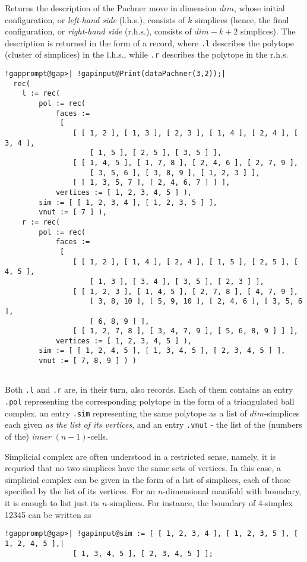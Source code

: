 \documentclass[a4paper,11pt]{report}
\begin{document}
{{{ Returns the description of the Pachner move in dimension $dim$, whose initial configuration, or \emph{left-hand side} (l.h.s.), consists of $k$ simplices (hence, the final configuration, or \emph{right-hand side} (r.h.s.), consists of $dim-k+2$ simplices). The description is returned in the form of a record, where \texttt{.l} describes the polytope (cluster of simplices) in the l.h.s., while \texttt{.r} describes the polytope in the r.h.s. 
\begin{Verbatim}[commandchars=!@|,fontsize=\small,frame=single,label=Example]
  !gapprompt@gap>| !gapinput@Print(dataPachner(3,2));|
  rec(
    l := rec(
        pol := rec(
            faces :=
             [
                [ [ 1, 2 ], [ 1, 3 ], [ 2, 3 ], [ 1, 4 ], [ 2, 4 ], [ 3, 4 ],
                    [ 1, 5 ], [ 2, 5 ], [ 3, 5 ] ],
                [ [ 1, 4, 5 ], [ 1, 7, 8 ], [ 2, 4, 6 ], [ 2, 7, 9 ],
                    [ 3, 5, 6 ], [ 3, 8, 9 ], [ 1, 2, 3 ] ],
                [ [ 1, 3, 5, 7 ], [ 2, 4, 6, 7 ] ] ],
            vertices := [ 1, 2, 3, 4, 5 ] ),
        sim := [ [ 1, 2, 3, 4 ], [ 1, 2, 3, 5 ] ],
        vnut := [ 7 ] ),
    r := rec(
        pol := rec(
            faces :=
             [
                [ [ 1, 2 ], [ 1, 4 ], [ 2, 4 ], [ 1, 5 ], [ 2, 5 ], [ 4, 5 ],
                    [ 1, 3 ], [ 3, 4 ], [ 3, 5 ], [ 2, 3 ] ],
                [ [ 1, 2, 3 ], [ 1, 4, 5 ], [ 2, 7, 8 ], [ 4, 7, 9 ],
                    [ 3, 8, 10 ], [ 5, 9, 10 ], [ 2, 4, 6 ], [ 3, 5, 6 ],
                    [ 6, 8, 9 ] ],
                [ [ 1, 2, 7, 8 ], [ 3, 4, 7, 9 ], [ 5, 6, 8, 9 ] ] ],
            vertices := [ 1, 2, 3, 4, 5 ] ),
        sim := [ [ 1, 2, 4, 5 ], [ 1, 3, 4, 5 ], [ 2, 3, 4, 5 ] ],
        vnut := [ 7, 8, 9 ] ) )
    						
\end{Verbatim}
 Both \texttt{.l} and \texttt{.r} are, in their turn, also records. Each of them contains an entry \texttt{.pol} representing the corresponding polytope in the form of a triangulated ball
complex, an entry \texttt{.sim} representing the same polytope as a list of $dim$-simplices each given \emph{as the list of its vertices}, and an entry \texttt{.vnut} - the list of the (numbers of the) \emph{inner} $(n-1)$-cells. }

 Simplicial complex are often understood in a restricted sense, namely, it is
requried that no two simplices have the same sets of vertices. In this case, a
simplicial complex can be given in the form of a list of simplices, each of
those specified by the list of its vertices. For an $n$-dimensional manifold with boundary, it is enough to list just its $n$-simplices. For instance, the boundary of 4-simplex 12345 can be written as 
\begin{Verbatim}[commandchars=!@|,fontsize=\small,frame=single,label=Example]
  !gapprompt@gap>| !gapinput@sim := [ [ 1, 2, 3, 4 ], [ 1, 2, 3, 5 ], [ 1, 2, 4, 5 ],|
  				[ 1, 3, 4, 5 ], [ 2, 3, 4, 5 ] ];
  				

\end{Verbatim}}}
\end{document}

